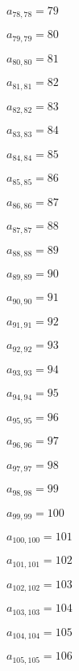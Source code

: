 \documentclass[a4paper,12pt]{article}
\begin{document}
$a _{ 78, 78 } = 79$

$a _{ 79, 79 } = 80$

$a _{ 80, 80 } = 81$

$a _{ 81, 81 } = 82$

$a _{ 82, 82 } = 83$

$a _{ 83, 83 } = 84$

$a _{ 84, 84 } = 85$

$a _{ 85, 85 } = 86$

$a _{ 86, 86 } = 87$

$a _{ 87, 87 } = 88$

$a _{ 88, 88 } = 89$

$a _{ 89, 89 } = 90$

$a _{ 90, 90 } = 91$

$a _{ 91, 91 } = 92$

$a _{ 92, 92 } = 93$

$a _{ 93, 93 } = 94$

$a _{ 94, 94 } = 95$

$a _{ 95, 95 } = 96$

$a _{ 96, 96 } = 97$

$a _{ 97, 97 } = 98$

$a _{ 98, 98 } = 99$

$a _{ 99, 99 } = 100$

$a _{ 100, 100 } = 101$

$a _{ 101, 101 } = 102$

$a _{ 102, 102 } = 103$

$a _{ 103, 103 } = 104$

$a _{ 104, 104 } = 105$

$a _{ 105, 105 } = 106$
\end{document}
